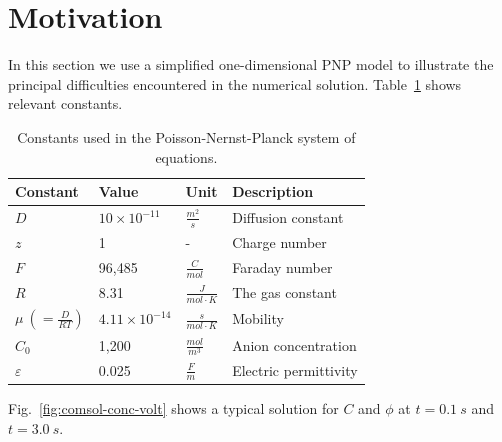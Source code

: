 \section{Motivation} \label{sec:moti}

In this section we use a simplified one-dimensional PNP model to illustrate the 
principal difficulties encountered in the numerical solution. Table~\ref{Table:used-constants} 
shows relevant constants.

\begin{table}[!ht]
\caption{Constants used in the Poisson-Nernst-Planck system of equations.}
\centering
\label{Table:used-constants}
{
\begin{tabular}{llll}
  \hline \hline
  Constant&Value&Unit&Description\\
  \hline
  $D$&$10\times10^{-11}$&$\frac{m^2}{s}$&Diffusion constant\\
  $z$&1&-&Charge number\\
  $F$&96,485&$\frac{C}{mol}$&Faraday number\\
  $R$&8.31&$\frac{J}{mol\cdot K}$&The gas constant\\
  $\mu\ \left( = \frac{D}{RT}\right)$&$4.11\times 10^{-14}$&$\frac{s}{mol\cdot K}$&Mobility\\
  $C_{0}$&1,200&$\frac{mol}{m^3}$&Anion concentration\\
  $\varepsilon$&0.025&$\frac{F}{m}$&Electric permittivity\\
  \hline
  \hline
\end{tabular}
}
\end{table}

\noindent
Fig.~\ref{fig:comsol-conc-volt} shows a typical solution for $C$ and $\phi$
at $t=0.1\ s$ and $t=3.0\ s$. 


